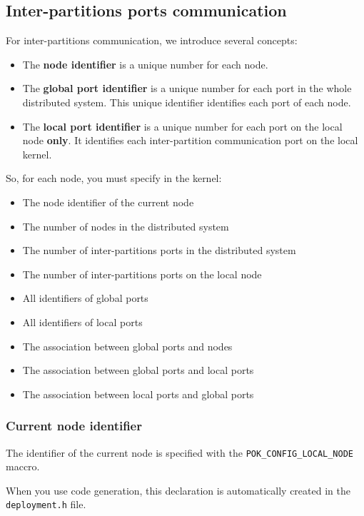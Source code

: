    \subsection{Inter-partitions ports communication}
   For inter-partitions communication, we introduce several concepts:
   \begin{itemize}
      \item
         The \textbf{node identifier} is a unique number for each node.
      \item
         The \textbf{global port identifier} is a unique number for each port in
         the whole distributed system. This unique identifier identifies each
         port of each node.
      \item
         The \textbf{local port identifier} is a unique number for each port on
         the local node \textbf{only}. It identifies each inter-partition
         communication port on the local kernel.
   \end{itemize}

   So, for each node, you must specify in the kernel:
   \begin{itemize}
      \item
         The node identifier of the current node
      \item
         The number of nodes in the distributed system
      \item
         The number of inter-partitions ports in the distributed system
      \item
         The number of inter-partitions ports on the local node
      \item
         All identifiers of global ports
      \item
         All identifiers of local ports
      \item
         The association between global ports and nodes
      \item
         The association between global ports and local ports
      \item
         The association between local ports and global ports
   \end{itemize}

   \subsubsection{Current node identifier}
   The identifier of the current node is specified with the
   \texttt{POK\_CONFIG\_LOCAL\_NODE} maccro.

   When you use code generation, this declaration is
   automatically created in the \texttt{deployment.h} file.

